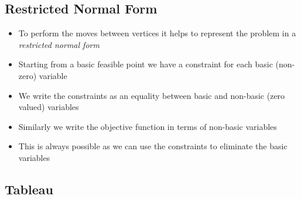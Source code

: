 
\begin{slide}
\section{Restricted Normal Form}

\begin{PauseHighLight}
  \begin{itemize}
  \item To perform the moves between vertices it helps to represent the
    problem in a \emph{restricted normal form}\pause
  \item Starting from a basic feasible point we have a constraint for
    each basic (non-zero) variable\pause
  \item We write the constraints as an equality between basic and
    non-basic (zero valued) variables\pause
  \item Similarly we write the objective function in terms of non-basic
    variables\pause
  \item This is always possible as we can use the constraints to
    eliminate the basic variables\pause
  \end{itemize}
\end{PauseHighLight}

\end{slide}


\begin{slide}
\section[-2]{Tableau}

\pb
\pause {}
\begin{center}
  \pause
\end{center}
\end{slide}


